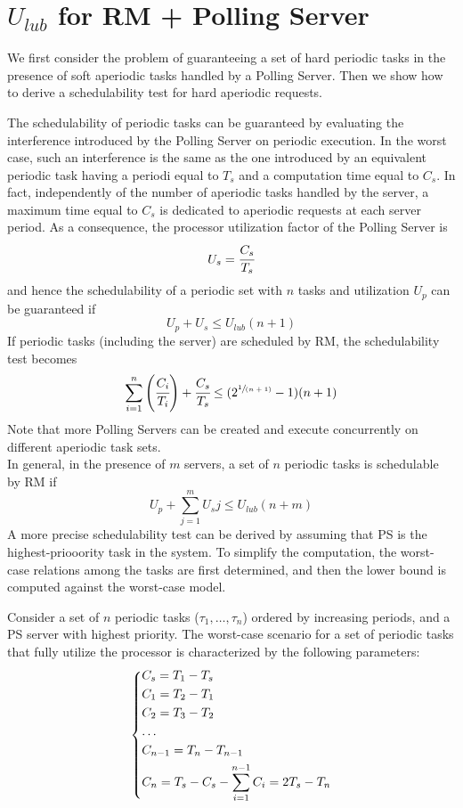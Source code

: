 \chapter{$U_{lub}$ for RM + Polling Server}
We first consider the problem of guaranteeing a set of hard periodic tasks in the presence of soft aperiodic tasks handled by a Polling Server. Then we show how to derive a schedulability test for hard aperiodic requests.

The schedulability of periodic tasks can be guaranteed by evaluating the interference introduced by the Polling Server on periodic execution. In the worst case, such an interference is the same as the one introduced by an equivalent periodic task having a periodi equal to $T_s$ and a computation time equal to $C_s$. In fact, independently of the number of aperiodic tasks handled by the server, a maximum time equal to $C_s$ is dedicated to aperiodic requests at each server period. As a consequence, the processor utilization factor of the Polling Server is
\[U_s = \cfrac{C_s}{T_s}\]
and hence the schedulability of a periodic set with $n$ tasks and utilization $U_p$ can be guaranteed if
\[U_p + U_s \le U_{lub}(n+1)\]
If periodic tasks (including the server) are scheduled by RM, the schedulability test becomes
\[\sum_{i=1}^{n} \left(\cfrac{C_i}{T_i}\right) + \cfrac{C_s}{T_s} \le (2^{\sfrac{1}{(n+1)}}- 1)(n+1)\]
Note that more Polling Servers can be created and execute concurrently on different aperiodic task sets.\\
In general, in the presence of $m$ servers, a set of $n$ periodic tasks is schedulable by RM if
\[U_p + \sum_{j=1}^m U_sj \le U_{lub}(n+m)\]
A more precise schedulability test can be derived by assuming that PS is the highest-priooority task in the system. To simplify the computation, the worst-case relations among the tasks are first determined, and then the lower bound is computed against the worst-case model.

Consider a set of $n$ periodic tasks ($\tau_1,\dots, \tau_n$) ordered by increasing periods, and a PS server with highest priority. The worst-case scenario for a set of periodic tasks that fully utilize the processor is characterized by the following parameters:
\[
\begin{dcases}
    C_s = T_1 - T_s\\
    C_1 = T_2 - T_1\\
    C_2 = T_3 - T_2\\
    \dots\\
    C_{n-1} = T_n - T_{n-1}\\
    C_n = T_s - C_s - \sum_{i=1}^{n-1}C_i = 2T_s - T_n
\end{dcases}    
\]

